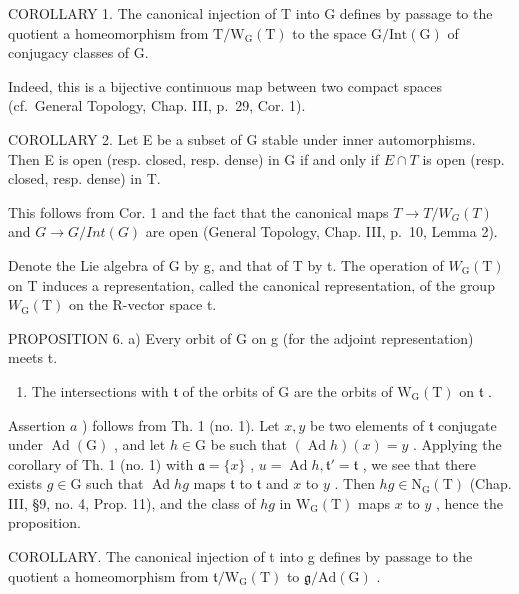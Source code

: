 COROLLARY 1. The canonical injection of T into G defines by passage to the quotient a homeomorphism from \(\mathrm{T}/\mathrm{W}_{\mathrm{G}}(\mathrm{T})\) to the space \(\mathrm{G}/\mathrm{Int}(\mathrm{G})\) of conjugacy classes of G.

Indeed, this is a bijective continuous map between two compact spaces (cf.~General Topology, Chap. III, p.~29, Cor. 1).

COROLLARY 2. Let E be a subset of G stable under inner automorphisms. Then E is open (resp. closed, resp. dense) in G if and only if \(E \cap T\) is open (resp. closed, resp. dense) in T.

This follows from Cor. 1 and the fact that the canonical maps \(T \rightarrow T/W_{G}(T)\) and \(G \rightarrow G/Int(G)\) are open (General Topology, Chap. III, p.~10, Lemma 2).

Denote the Lie algebra of G by g, and that of T by t. The operation of \(W_{\mathrm{G}}(\mathrm{T})\) on T induces a representation, called the canonical representation, of the group \(W_{\mathrm{G}}(\mathrm{T})\) on the R-vector space t.

PROPOSITION 6. a) Every orbit of G on g (for the adjoint representation) meets t.

\begin{enumerate}
\def\labelenumi{\alph{enumi})}
\setcounter{enumi}{1}
\tightlist
\item
  The intersections with \(\mathfrak{t}\) of the orbits of \(\mathrm{G}\) are the orbits of \(\mathrm{W_G(T)}\) on \(\mathfrak{t}\) .
\end{enumerate}

Assertion \(a\) ) follows from Th. 1 (no. 1). Let \(x, y\) be two elements of \(\mathfrak{t}\) conjugate under \(\operatorname{Ad}(\mathrm{G})\) , and let \(h \in \mathrm{G}\) be such that \((\operatorname{Ad} h)(x) = y\) . Applying the corollary of Th. 1 (no. 1) with \(\mathfrak{a} = \{x\}\) , \(u = \operatorname{Ad} h, \mathfrak{t}' = \mathfrak{t}\) , we see that there exists \(g \in \mathrm{G}\) such that \(\operatorname{Ad} hg\) maps \(\mathfrak{t}\) to \(\mathfrak{t}\) and \(x\) to \(y\) . Then \(hg \in \mathrm{N}_{\mathrm{G}}(\mathrm{T})\) (Chap. III, §9, no. 4, Prop. 11), and the class of \(hg\) in \(\mathrm{W}_{\mathrm{G}}(\mathrm{T})\) maps \(x\) to \(y\) , hence the proposition.

COROLLARY. The canonical injection of t into g defines by passage to the quotient a homeomorphism from \(\mathfrak{t}/\mathrm{W}_{\mathrm{G}}(\mathrm{T})\) to \(\mathfrak{g}/\mathrm{Ad}(\mathrm{G})\) .

